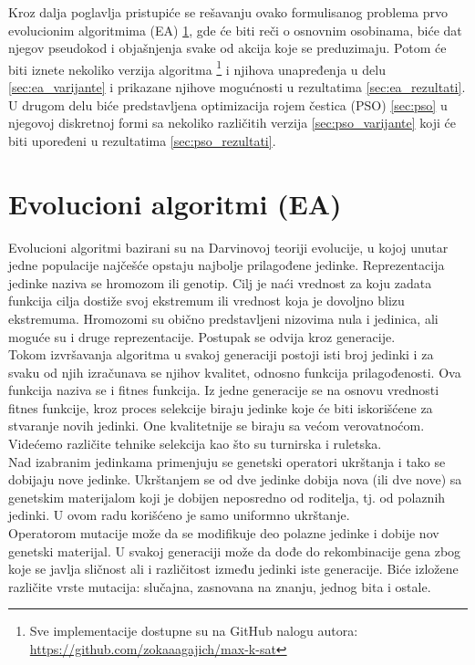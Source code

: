 \documentclass[a4paper]{article}
\begin{document}
Kroz dalja poglavlja pristupiće se rešavanju ovako formulisanog problema prvo evolucionim
algoritmima (EA) \ref{sec:ea}, gde će biti reči o osnovnim osobinama, 
biće dat njegov pseudokod i objašnjenja svake od akcija koje se preduzimaju. 
Potom će biti iznete nekoliko verzija  algoritma
\footnote{Sve implementacije dostupne su na GitHub nalogu autora: \\
\url{https://github.com/zokaaagajich/max-k-sat}} 
i njihova unapređenja u delu \ref{sec:ea_varijante} i prikazane njihove mogućnosti
u rezultatima \ref{sec:ea_rezultati}. U drugom delu biće predstavljena optimizacija
rojem čestica (PSO) \ref{sec:pso} u njegovoj diskretnoj formi sa nekoliko različitih verzija
\ref{sec:pso_varijante} koji će biti upoređeni u rezultatima \ref{sec:pso_rezultati}.


\section{Evolucioni algoritmi (EA)}
\label{sec:ea}
Evolucioni algoritmi \cite{vi_Janicic} bazirani su na Darvinovoj teoriji evolucije, 
u kojoj unutar jedne populacije najčešće opstaju najbolje prilagođene jedinke. 
Reprezentacija jedinke naziva se hromozom ili genotip. 
Cilj je naći vrednost za koju zadata funkcija cilja dostiže svoj ekstremum 
ili vrednost koja je dovoljno blizu ekstremuma. Hromozomi su obično predstavljeni
nizovima nula i jedinica, ali moguće su i druge reprezentacije. 
Postupak se odvija kroz generacije.\\

Tokom izvršavanja algoritma u svakoj generaciji postoji isti broj jedinki i za svaku od
njih izračunava se njihov kvalitet, odnosno funkcija prilagođenosti.
Ova funkcija naziva se i fitnes funkcija.
Iz jedne generacije se na osnovu vrednosti fitnes funkcije, 
kroz proces selekcije biraju jedinke koje će biti iskorišćene za stvaranje novih jedinki. 
One kvalitetnije se biraju sa većom verovatnoćom. 
Videćemo različite tehnike selekcija kao što su turnirska i ruletska. \\

Nad izabranim jedinkama primenjuju se genetski operatori ukrštanja
i tako se dobijaju nove jedinke. Ukrštanjem se od dve jedinke dobija nova (ili dve nove) sa
genetskim materijalom koji je dobijen neposredno od roditelja, 
tj. od polaznih jedinki. U ovom radu korišćeno je samo uniformno ukrštanje. \\

Operatorom mutacije može da se modifikuje deo polazne jedinke i dobije nov genetski materijal. 
U svakoj generaciji može da dođe do rekombinacije gena zbog koje se 
javlja sličnost ali i različitost između jedinki iste generacije. 
Biće izložene različite vrste mutacija: slučajna, zasnovana na znanju, jednog bita i ostale. \\
\end{document}
